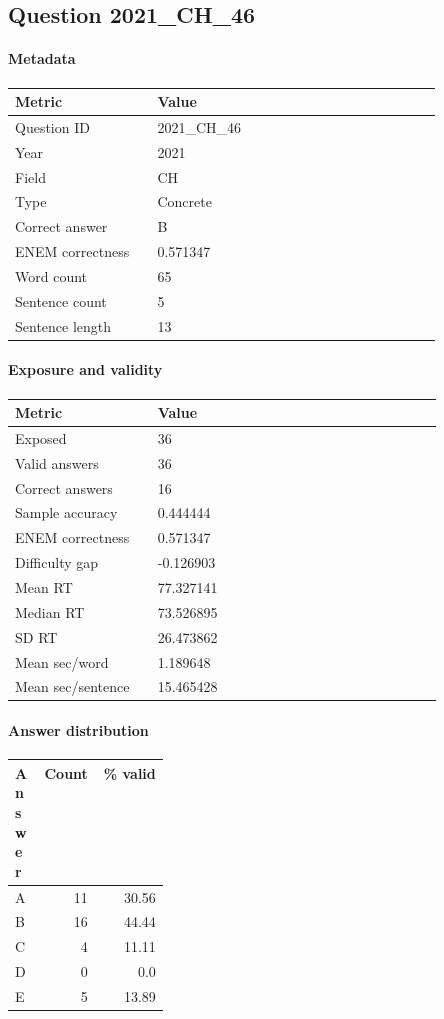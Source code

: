 \subsection*{Question 2021\_CH\_46}
\label{sec:q_2021_CH_46}
\paragraph{Metadata}
\begin{tabular}{p{0.30\linewidth}p{0.60\linewidth}}
\toprule
Metric & Value\\
\midrule
Question ID & 2021\_CH\_46\\
Year & 2021\\
Field & CH\\
Type & Concrete\\
Correct answer & B\\
ENEM correctness & 0.571347\\
Word count & 65\\
Sentence count & 5\\
Sentence length & 13\\
\bottomrule
\end{tabular}

\paragraph{Exposure and validity}
\begin{tabular}{p{0.30\linewidth}p{0.60\linewidth}}
\toprule
Metric & Value\\
\midrule
Exposed & 36\\
Valid answers & 36\\
Correct answers & 16\\
Sample accuracy & 0.444444\\
ENEM correctness & 0.571347\\
Difficulty gap & -0.126903\\
Mean RT & 77.327141\\
Median RT & 73.526895\\
SD RT & 26.473862\\
Mean sec/word & 1.189648\\
Mean sec/sentence & 15.465428\\
\bottomrule
\end{tabular}

\paragraph{Answer distribution}
\begin{tabular}{p{0.18\linewidth}rr}
\toprule
Answer & Count & \% valid\\
\midrule
A & 11 & 30.56\\
B & 16 & 44.44\\
C & 4 & 11.11\\
D & 0 & 0.0\\
E & 5 & 13.89\\
\bottomrule
\end{tabular}

